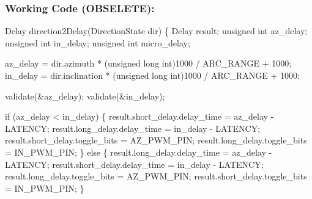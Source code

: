 \documentclass[]{report}
\begin{document}
\subsubsection{Working Code (OBSELETE):}
Delay direction2Delay(DirectionState dir) \newline
\{\newline
	Delay result;\newline
	unsigned int az\_delay;\newline
	unsigned int in\_delay;\newline
	unsigned int micro\_delay;\newline
	
	az\_delay = dir.azimuth * (unsigned long int)1000 / ARC\_RANGE + 1000;\newline
	in\_delay = dir.inclination * (unsigned long int)1000 / ARC\_RANGE + 1000;\newline
	
	validate(\&az\_delay);\newline
	validate(\&in\_delay);\newline
	
	if (az\_delay < in\_delay)\newline
	\{\newline
		result.short\_delay.delay\_time = az\_delay - LATENCY;\newline
		result.long\_delay.delay\_time = in\_delay - LATENCY;\newline
		result.short\_delay.toggle\_bits = AZ\_PWM\_PIN;\newline
		result.long\_delay.toggle\_bits = IN\_PWM\_PIN;\newline
	\}\newline
	else\newline
	\{\newline
		result.long\_delay.delay\_time = az\_delay - LATENCY;\newline
		result.short\_delay.delay\_time = in\_delay - LATENCY;\newline
		result.long\_delay.toggle\_bits = AZ\_PWM\_PIN;\newline
		result.short\_delay.toggle\_bits = IN\_PWM\_PIN;\newline
	\}\newline
	
\end{document}
